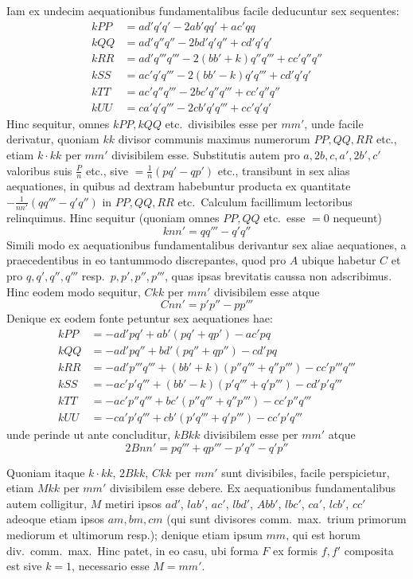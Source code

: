\documentclass[12pt,a4paper]{article}
\theoremstyle{plain}
\theoremstyle{definition}
\theoremstyle{remark}
\theoremstyle{problemstyle}
\begin{document}
Iam ex undecim aequationibus fundamentalibus facile deducuntur sex sequentes:
\begin{align*}
kPP &= ad'q'q' - 2ab'qq' + ac'qq \\
kQQ &= ad'q''q'' - 2bd'q'q'' + cd'q'q' \\
kRR &= ad'q'''q''' - 2(bb'+k)q''q''' + cc'q''q'' \\
kSS &= ac'q'q''' - 2(bb'-k)q'q''' + cd'q'q' \\
kTT &= ac'q''q''' - 2bc'q''q''' + cc'q''q'' \\
kUU &= ca'q'q''' - 2cb'q'q''' + cc'q'q'
\end{align*}
Hinc sequitur, omnes $kPP, kQQ$ etc.\ divisibiles esse per $mm'$, unde facile derivatur, quoniam $kk$ divisor communis maximus numerorum $PP, QQ, RR$ etc., etiam $k \cdot kk$ per $mm'$ divisibilem esse. Substitutis autem pro $a, 2b, c, a', 2b', c'$ valoribus suis $\frac{P}{n}$ etc., sive $= \frac{1}{n}(pq' - qp')$ etc., transibunt in sex alias aequationes, in quibus ad dextram habebuntur producta ex quantitate $-\tfrac{1}{nn'}(qq''' - q'q'')$ in $PP, QQ, RR$ etc.\ Calculum facillimum lectoribus relinquimus. Hinc sequitur (quoniam omnes $PP, QQ$ etc.\ esse $=0$ nequeunt)
\[
knn' = qq''' - q'q''
\]
Simili modo ex aequationibus fundamentalibus derivantur sex aliae aequationes, a praecedentibus in eo tantummodo discrepantes, quod pro $A$ ubique habetur $C$ et pro $q, q', q'', q'''$ resp.\ $p, p', p'', p'''$, quas ipsas brevitatis caussa non adscribimus. Hinc eodem modo sequitur, $Ckk$ per $mm'$ divisibilem esse atque
\[
Cnn' = p'p'' - pp'''
\]
Denique ex eodem fonte petuntur sex aequationes hae:
\begin{align*}
kPP &= -ad'pq' + ab'(pq' + qp') - ac'pq \\
kQQ &= -ad'pq'' + bd'(pq'' + qp'') - cd'pq \\
kRR &= -ad'p'''q''' + (bb'+k)(p''q''' + q''p''') - cc'p'''q''' \\
kSS &= -ac'p'q''' + (bb'-k)(p'q''' + q'p''') - cd'p'q''' \\
kTT &= -ac'p''q''' + bc'(p''q''' + q''p''') - cc'p''q''' \\
kUU &= -ca'p'q''' + cb'(p'q''' + q'p''') - cc'p'q'''
\end{align*}
unde perinde ut ante concluditur, $kBkk$ divisibilem esse per $mm'$ atque
\[
2Bnn' = pq''' + qp''' - p'q'' - q'p''
\]

Quoniam itaque $k \cdot kk$, $2Bkk$, $Ckk$ per $mm'$ sunt divisibiles, facile perspicietur, etiam $Mkk$ per $mm'$ divisibilem esse debere. Ex aequationibus fundamentalibus autem colligitur, $M$ metiri ipsos $ad'$, $lab'$, $ac'$, $lbd'$, $Abb'$, $lbc'$, $ca'$, $lcb'$, $cc'$ adeoque etiam ipsos $am, bm, cm$ (qui sunt divisores comm.\ max.\ trium primorum mediorum et ultimorum resp.); denique etiam ipsum $mm$, qui est horum div.\ comm.\ max.\ Hinc patet, in eo casu, ubi forma $F$ ex formis $f, f'$ composita est sive $k=1$, necessario esse $M = mm'$.
\end{document}
